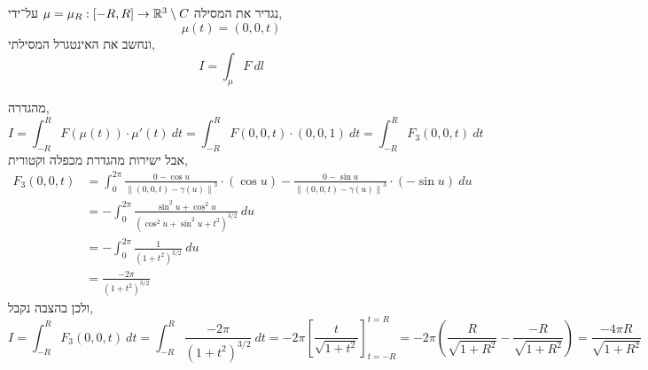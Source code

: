 \subquestion{}
נגדיר את המסילה $\mu = \mu_R : [-R, R] \to \mathbb{R}^3 \setminus C$ על־ידי,
\[
	\mu(t)
	= (0, 0, t)
\]
ונחשב את האינטגרל המסילתי,
\[
	I = \int_{\mu} F\ dl
\]
\begin{solution}
	מהגדרה,
	\[
		I
		= \int_{-R}^{R} F(\mu(t)) \cdot \mu'(t)\ dt
		= \int_{-R}^{R} F(0, 0, t) \cdot (0, 0, 1)\ dt
		= \int_{-R}^{R} F_3(0, 0, t)\ dt
	\]
	אבל ישירות מהגדרת מכפלה וקטורית,
	\begin{align*}
		F_3(0, 0, t)
		& = \int_{0}^{2 \pi} \frac{0 - \cos u}{{\lVert (0, 0, t) - \gamma(u) \rVert}^3} \cdot (\cos u) - \frac{0 - \sin u}{{\lVert (0, 0, t) - \gamma(u) \rVert}^3} \cdot (- \sin u)\ du \\
		& = - \int_{0}^{2 \pi} \frac{\sin^2 u + \cos^2 u}{{(\cos^2 u + \sin^2 u + t^2)}^{3 / 2}}\ du \\
		& = - \int_{0}^{2 \pi} \frac{1}{{(1 + t^2)}^{3 / 2}}\ du \\
		& = \frac{-2 \pi}{{(1 + t^2)}^{3 / 2}}
	\end{align*}
	ולכן בהצבה נקבל,
	\[
		I
		= \int_{-R}^{R} F_3(0, 0, t)\ dt
		= \int_{-R}^{R} \frac{-2 \pi}{{(1 + t^2)}^{3 / 2}}\ dt
		= - 2 \pi {\left[ \frac{t}{\sqrt{1 + t^2}}\right]}_{t = -R}^{t = R}
		= - 2 \pi \left(\frac{R}{\sqrt{1 + R^2}} - \frac{-R}{\sqrt{1 + R^2}}\right)
		= \frac{-4 \pi R}{\sqrt{1 + R^2}}
	\]
\end{solution}


